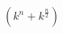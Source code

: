 \documentclass[preview]{standalone}
\begin{document}
\begin{align*}
\left( k^n + k^{\frac{n}{2}} \right)
\end{align*}
\end{document}
